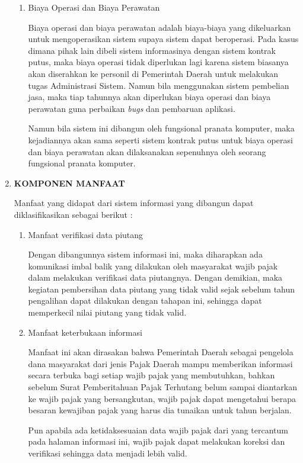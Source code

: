 \documentclass[pdftex,12pt, oneside]{article}
\begin{document}
\begin{enumerate}
\begin{enumerate}
	\item Biaya Operasi dan Biaya Perawatan
	
Biaya operasi dan biaya perawatan adalah biaya-biaya yang dikeluarkan untuk mengoperasikan sistem supaya sistem dapat beroperasi. Pada kasus dimana pihak lain dibeli sistem informasinya dengan sistem kontrak putus, maka biaya operasi tidak diperlukan lagi karena sistem biasanya akan diserahkan ke personil di Pemerintah Daerah untuk melakukan tugas Administrasi Sistem. Namun bila menggunakan sistem pembelian jasa, maka tiap tahunnya akan diperlukan biaya operasi dan biaya perawatan guna perbaikan \textit{bugs} dan pembaruan aplikasi.

Namun bila sistem ini dibangun oleh fungsional pranata komputer, maka kejadiannya akan sama seperti sistem kontrak putus untuk biaya operasi dan biaya perawatan akan dilaksanakan sepenuhnya oleh seorang fungsional pranata komputer.
	
\end{enumerate}	
	
	\item \textbf{KOMPONEN MANFAAT}
	
Manfaat yang didapat dari sistem informasi yang dibangun dapat diklasifikasikan sebagai berikut :

\begin{enumerate}
	\item Manfaat verifikasi data piutang
	
Dengan dibangunnya sistem informasi ini, maka diharapkan ada komunikasi imbal balik yang dilakukan oleh masyarakat wajib pajak dalam melakukan verifikasi data piutangnya. Dengan demikian, maka kegiatan pembersihan data piutang yang tidak valid sejak sebelum tahun pengalihan dapat dilakukan dengan tahapan ini, sehingga dapat memperkecil nilai piutang yang tidak valid.
		
	\item Manfaat keterbukaan informasi
	
Manfaat ini akan dirasakan bahwa Pemerintah Daerah sebagai pengelola dana masyarakat dari jenis Pajak Daerah mampu memberikan informasi secara terbuka bagi setiap wajib pajak yang membutuhkan, bahkan sebelum Surat Pemberitahuan Pajak Terhutang belum sampai diantarkan ke wajib pajak yang bersangkutan, wajib pajak dapat mengetahui berapa besaran kewajiban pajak yang harus dia tunaikan untuk tahun berjalan.

Pun apabila ada ketidaksesuaian data wajib pajak dari yang tercantum pada halaman informasi ini, wajib pajak dapat melakukan koreksi dan verifikasi sehingga data menjadi lebih valid.	
	

\end{enumerate}
\end{enumerate}
\end{document}
